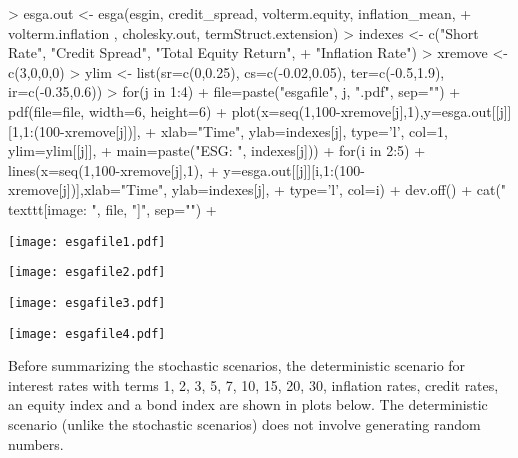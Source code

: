 \documentclass[12pt]{article}
\begin{document}
\begin{Schunk}
\begin{Sinput}
> esga.out <- esga(esgin, credit_spread, volterm.equity, inflation_mean,
+   volterm.inflation , cholesky.out, termStruct.extension)
> indexes <- c("Short Rate", "Credit Spread", "Total Equity Return", 
+   "Inflation Rate")
> xremove <- c(3,0,0,0)
> ylim <- list(sr=c(0,0.25), cs=c(-0.02,0.05), ter=c(-0.5,1.9), ir=c(-0.35,0.6))
> for(j in 1:4) {
+   file=paste("esgafile", j, ".pdf", sep="")  
+   pdf(file=file, width=6, height=6)  
+   plot(x=seq(1,100-xremove[j],1),y=esga.out[[j]][1,1:(100-xremove[j])],
+     xlab="Time", ylab=indexes[j], type='l', col=1, ylim=ylim[[j]], 
+     main=paste("ESG: ", indexes[j]))
+   for(i in 2:5)
+     lines(x=seq(1,100-xremove[j],1),
+       y=esga.out[[j]][i,1:(100-xremove[j])],xlab="Time", ylab=indexes[j], 
+       type='l', col=i)
+   dev.off()  
+   cat("\\texttt{[image: ", file, "]}\n\n", sep="")  
+ }
\end{Sinput}
\texttt{[image: esgafile1.pdf]}

\texttt{[image: esgafile2.pdf]}

\texttt{[image: esgafile3.pdf]}

\texttt{[image: esgafile4.pdf]}\end{Schunk}

Before summarizing the stochastic scenarios, the deterministic scenario
for interest rates with terms 1, 2, 3, 5, 7, 10, 15, 20, 30, inflation rates,
credit rates, an equity index and a bond index are shown in plots below.
The deterministic scenario (unlike the stochastic scenarios) does not 
involve generating random numbers.
\end{document}
